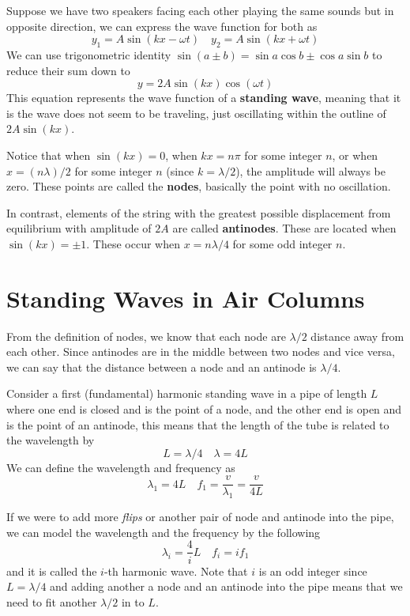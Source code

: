 Suppose we have two speakers facing each other playing the same sounds but in opposite direction,
we can express the wave function for both as 
\[ y_1 = A\sin(kx - \omega t)\quad y_2 = A\sin(kx + \omega t) \]
We can use trigonometric identity $\sin(a \pm b) = \sin a\cos b \pm \cos a \sin b$
to reduce their sum down to \begin{equation}\label{18.1}
    y = 2A\sin(kx)\cos(\omega t)
\end{equation}
This equation represents the wave function of a \textbf{standing wave}, meaning that it is
the wave does not seem to be traveling, just oscillating within the outline of $2A\sin(kx)$.

Notice that when $\sin(kx) = 0$, when $kx = n\pi$ for some integer $n$, or when $x =
(n\lambda)/2$ for some integer $n$ (since $k=\lambda/2$), the amplitude will always
be zero. These points are called the \textbf{nodes}, basically the point with no oscillation.

In contrast, elements of the string with the greatest possible displacement from equilibrium
with amplitude of $2A$ are called \textbf{antinodes}. These are located when $\sin(kx) = \pm 1$.
These occur when $x = n\lambda/4$ for some odd integer $n$.

\section{Standing Waves in Air Columns}

From the definition of nodes, we know that each node are $\lambda/2$ distance away from each
other. Since antinodes are in the middle between two nodes and vice versa, we can say that
the distance between a node and an antinode is $\lambda/4$.

Consider a first (fundamental) harmonic standing wave in a pipe of length $L$ where one end is
closed and is the point of a node, and the other end is open and is the point of an antinode,
this means that the length of the tube is related to the wavelength by 
\[ L = \lambda/4 \quad \lambda = 4L \]
We can define the wavelength and frequency as 
\[ \lambda_1 = 4L\quad f_1 = \frac{v}{\lambda_1} = \frac{v}{4L} \]

If we were to add more \textit{flips} or another pair of node and antinode into the pipe, we can 
model the wavelength and the frequency by the following 
\[ \lambda_i = \frac{4}{i}L\quad f_i = i f_1 \]
and it is called the $i$-th harmonic wave. Note that $i$ is an odd integer since $L = \lambda/4$ and 
adding another a node and an antinode into the pipe means that we need to fit another $\lambda/2$
in to $L$.

